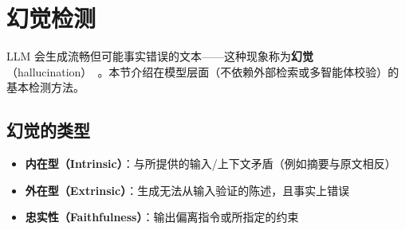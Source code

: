 \newpage
\section{幻觉检测}
\label{sec:hallucination}

LLM 会生成流畅但可能事实错误的文本——这种现象称为\textbf{幻觉}（hallucination）~\cite{ji2023hallucination}。本节介绍在模型层面（不依赖外部检索或多智能体校验）的基本检测方法。

\subsection{幻觉的类型}
\label{types-of-hallucination}

\begin{keybox}[幻觉分类法]
\begin{itemize}
  \item \textbf{内在型（Intrinsic）}：与所提供的输入/上下文矛盾（例如摘要与原文相反）
  \item \textbf{外在型（Extrinsic）}：生成无法从输入验证的陈述，且事实上错误
  \item \textbf{忠实性（Faithfulness）}：输出偏离指令或所指定的约束
\end{itemize}
\end{keybox}

